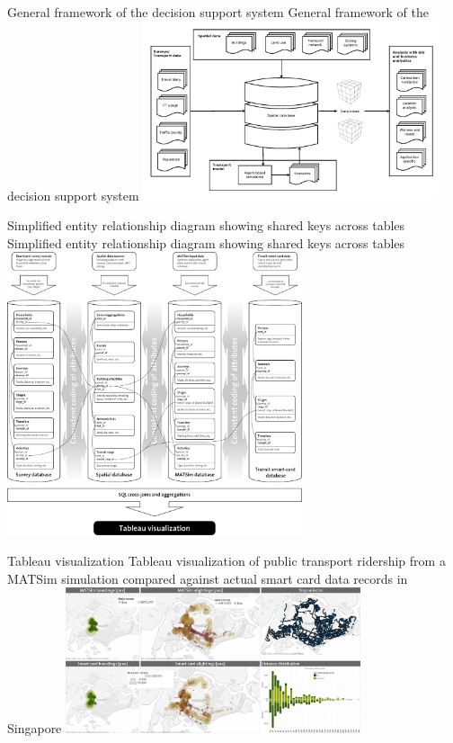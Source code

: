 \createfigure%
{General framework of the decision support system}%
{General framework of the decision support system}%
{\label{fig:analyticsFramework}}%
{\includegraphics[width=0.65\textwidth, angle=0]{extending/figures/businessanalytics/general}}%
{}

\createfigure%
{Simplified entity relationship diagram showing shared keys across tables}%
{Simplified entity relationship diagram showing shared keys across tables}%
{\label{fig:analyticsERD}}%
{\includegraphics[width=0.65\textwidth, angle=0]{extending/figures/businessanalytics/schema}}%
{}

\createfigure%
{Tableau visualization}%
{Tableau visualization of public transport ridership from a MATSim simulation compared against actual smart card data records in Singapore}%
{\label{fig:analyticsTableau}}%
{\includegraphics[width=0.65\textwidth, angle=0]{extending/figures/businessanalytics/tableau.png}}%
{}

